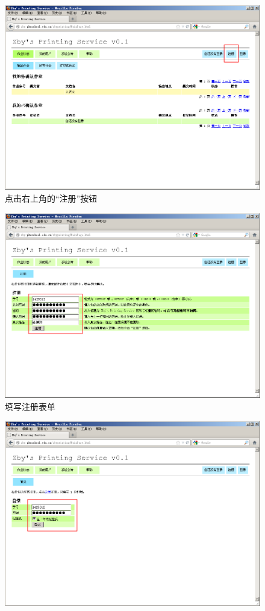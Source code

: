 \documentclass{article}
\begin{document}
\begin{CJK}{UTF8}{gbsn}
			\begin{figure}[hp]
				\centering
				\includegraphics[height=0.45\textheight]{register1.png}
				\caption{点击右上角的``注册''按钮}
				\label{fig:register1}
			\end{figure}
			\begin{figure}[hp]
				\centering
				\includegraphics[height=0.45\textheight]{register2.png}
				\caption{填写注册表单}
				\label{fig:register2}
			\end{figure}
			\begin{figure}[hp]
				\centering
				\includegraphics[height=0.45\textheight]{login.png}

\end{figure}
\end{CJK}
\end{document}
